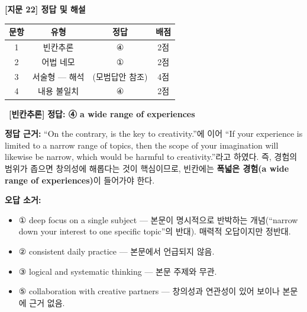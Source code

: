 \documentclass[11pt,a4paper]{article}
\newcommand{\qno}[1]{\par\vspace{10pt}\noindent{\sffamily\bfseries #1.}\ }
\begin{document}
\begin{center}
{\fontsize{15}{17}\selectfont\sffamily\bfseries [지문 22] 정답 및 해설}
\end{center}
\vspace{8pt}

\begin{center}
\renewcommand{\arraystretch}{1.4}
\begin{tabular}{cccc}
\toprule
\textbf{문항} & \textbf{유형} & \textbf{정답} & \textbf{배점} \\
\midrule
1 & 빈칸추론 & ④ & 2점 \\
2 & 어법 네모 & ① & 2점 \\
3 & 서술형 — 해석 & (모범답안 참조) & 4점 \\
4 & 내용 불일치 & ④ & 2점 \\
\bottomrule
\end{tabular}
\end{center}

\vspace{10pt}

\qno{1}\textbf{[빈칸추론]} \textbf{정답: ④ a wide range of experiences}

\par\vspace{4pt}
\textbf{정답 근거:} ``On the contrary, \underline{\hspace{3cm}} is the key to creativity.''에 이어 ``If your experience is limited to a narrow range of topics, then the scope of your imagination will likewise be narrow, which would be harmful to creativity.''라고 하였다. 즉, 경험의 범위가 좁으면 창의성에 해롭다는 것이 핵심이므로, 빈칸에는 \textbf{폭넓은 경험(a wide range of experiences)}이 들어가야 한다.

\par\vspace{4pt}
\textbf{오답 소거:}
\begin{itemize}[leftmargin=2em,itemsep=2pt]
  \item ① deep focus on a single subject — 본문이 명시적으로 반박하는 개념(``narrow down your interest to one specific topic''의 반대). 매력적 오답이지만 정반대.
  \item ② consistent daily practice — 본문에서 언급되지 않음.
  \item ③ logical and systematic thinking — 본문 주제와 무관.
  \item ⑤ collaboration with creative partners — 창의성과 연관성이 있어 보이나 본문에 근거 없음.
\end{itemize}
\end{document}
